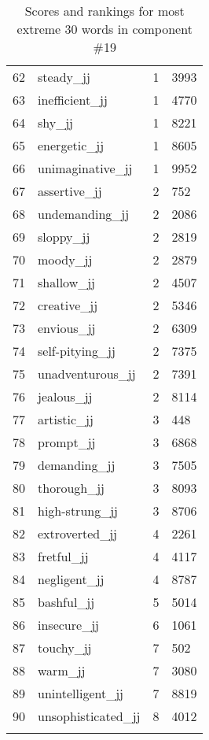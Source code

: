 \begin{longtable}[!htbp]{| rlr@{.}l |}
    62 & steady\_jj & 1 & 3993 \\
    63 & inefficient\_jj & 1 & 4770 \\
    64 & shy\_jj & 1 & 8221 \\
    65 & energetic\_jj & 1 & 8605 \\
    66 & unimaginative\_jj & 1 & 9952 \\
    67 & assertive\_jj & 2 & 752 \\
    68 & undemanding\_jj & 2 & 2086 \\
    69 & sloppy\_jj & 2 & 2819 \\
    70 & moody\_jj & 2 & 2879 \\
    71 & shallow\_jj & 2 & 4507 \\
    72 & creative\_jj & 2 & 5346 \\
    73 & envious\_jj & 2 & 6309 \\
    74 & self-pitying\_jj & 2 & 7375 \\
    75 & unadventurous\_jj & 2 & 7391 \\
    76 & jealous\_jj & 2 & 8114 \\
    77 & artistic\_jj & 3 & 448 \\
    78 & prompt\_jj & 3 & 6868 \\
    79 & demanding\_jj & 3 & 7505 \\
    80 & thorough\_jj & 3 & 8093 \\
    81 & high-strung\_jj & 3 & 8706 \\
    82 & extroverted\_jj & 4 & 2261 \\
    83 & fretful\_jj & 4 & 4117 \\
    84 & negligent\_jj & 4 & 8787 \\
    85 & bashful\_jj & 5 & 5014 \\
    86 & insecure\_jj & 6 & 1061 \\
    87 & touchy\_jj & 7 & 502 \\
    88 & warm\_jj & 7 & 3080 \\
    89 & unintelligent\_jj & 7 & 8819 \\
    90 & unsophisticated\_jj & 8 & 4012 \\
    \hline
    \caption{Scores and rankings for most extreme 30 words in component \#19} \\
\end{longtable}
